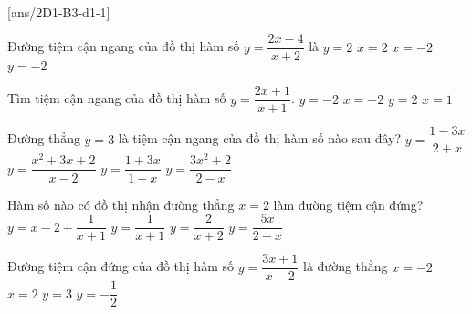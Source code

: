 \\
\setcounter{ex}{0}
[ans/2D1-B3-d1-1]
\begin{ex}
	Đường tiệm cận ngang của đồ thị hàm số $y=\dfrac{2x-4}{x+2}$ là
	\choice
	{\True $y=2$}
	{  $x=2$}
	{ $x=-2$}
	{$y=-2$}
	
\end{ex}

\begin{ex}
	Tìm tiệm cận ngang của đồ thị hàm số $ y = \dfrac{2x + 1}{ x +1} $.
	\choice
	{ \True $  y = -2 $}
	{$  x = -2 $}
	{ $  y = 2 $}
	{$ x = 1 $}
\end{ex}

\begin{ex}
	Đường thẳng $y=3$ là tiệm cận ngang của đồ thị hàm số nào sau đây?
	\choice
	{$y=\dfrac{1-3x}{2+x}$}
	{$y=\dfrac{x^2+3x+2}{x-2}$}
	{\True $y=\dfrac{1+3x}{1+x}$}
	{$y=\dfrac{3x^2+2}{2-x}$}
\end{ex}

\begin{ex}
	Hàm số nào có đồ thị nhận đường thẳng $x = 2$ làm đường tiệm cận đứng?
	\choice
	{$y=x-2+\dfrac{1}{x+1}$}
	{$y=\dfrac{1}{x+1}$}
	{$y=\dfrac{2}{x+2}$}
	{\True $y=\dfrac{5x}{2-x}$}
\end{ex}

\begin{ex}
	Đường tiệm cận đứng của đồ thị hàm số $y=\dfrac{3x+1}{x-2}$ là đường thẳng
	\choice
	{$x=-2$}
	{\True $x=2$}
	{$y=3$}
	{$y=-\dfrac{1}{2}$}
\end{ex}

